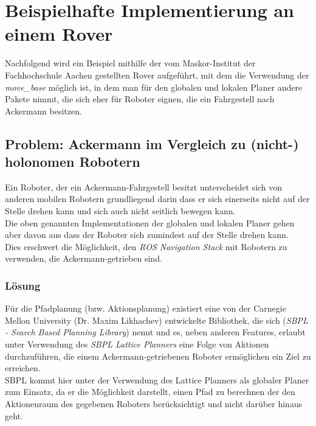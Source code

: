 \documentclass[oribibl]{llncs}
\begin{document}
\section{Beispielhafte Implementierung an einem Rover}
Nachfolgend wird ein Beispiel mithilfe der vom Maskor-Institut der Fachhochschule Aachen gestellten Rover aufgeführt, mit dem die Verwendung der \textit{move\_base} möglich ist, in dem man für den globalen und lokalen Planer andere Pakete nimmt, die sich eher für Roboter eignen, die ein Fahrgestell nach Ackermann besitzen.\\
\subsection{Problem: Ackermann im Vergleich zu (nicht-) holonomen Robotern}
Ein Roboter, der ein Ackermann-Fahrgestell besitzt unterscheidet sich von anderen mobilen Robotern grundliegend darin dass er sich einerseits nicht auf der Stelle drehen kann und sich auch nicht seitlich bewegen kann.\\
Die oben genannten Implementationen der globalen und lokalen Planer gehen aber davon aus dass der Roboter sich zumindest auf der Stelle drehen kann.\\
Dies erschwert die Möglichkeit, den \textit{ROS Navigation Stack} mit Robotern zu verwenden, die Ackermann-getrieben sind.\cite{ackermannGroup}
\subsubsection{Lösung}
Für die Pfadplanung (bzw. Aktionsplanung) existiert eine von der Carnegie Mellon University (Dr. Maxim Likhachev\cite{likhachev}) entwickelte Bibliothek, die sich (\textit{SBPL - Search Based Planning Library})\cite{sbplMain} nennt und es, neben anderen Features, erlaubt unter Verwendung des \textit{SBPL Lattice Planners} eine Folge von Aktionen durchzuführen, die einem Ackermann-getriebenen Roboter ermöglichen ein Ziel zu erreichen.\\
SBPL kommt hier unter der Verwendung des Lattice Planners als globaler Planer zum Einsatz, da er die Möglichkeit darstellt, einen Pfad zu berechnen der den Aktionenraum des gegebenen Roboters berücksichtigt und nicht darüber hinaus geht.
\newpage
\end{document}
